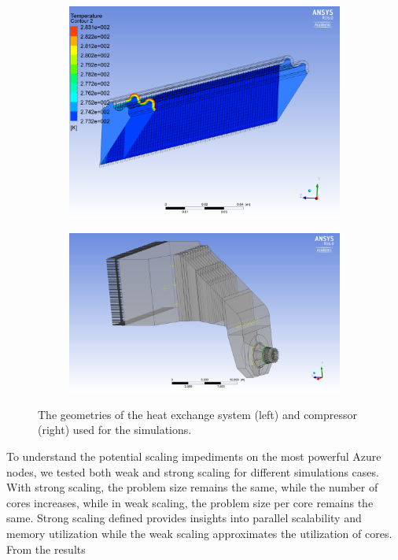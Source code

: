 \documentclass[3p,times]{elsarticle}
\begin{document}
\begin{figure}
\centering
\begin{subfigure}{.4\textwidth}
  \centering
			\includegraphics[width=\linewidth]{pipe}	
  \label{fig:pipe}
\end{subfigure}%
\begin{subfigure}{.5\textwidth}
  \centering
  \includegraphics[width=\linewidth]{compressor}
  \label{fig:compressor}
\end{subfigure}
\caption{The geometries of the heat exchange system (left) and compressor (right) used for the simulations. }
\label{fig:cfx}
\end{figure}

To understand the potential scaling impediments on the most powerful Azure nodes, we tested both weak and strong scaling for different simulations cases. With strong scaling, the problem size remains the same, while the number of cores increases, while in weak scaling, the problem size per core remains the same. Strong scaling defined  provides insights into parallel scalability and memory utilization while the weak scaling approximates the utilization of cores. From the results 
 
\end{document}
